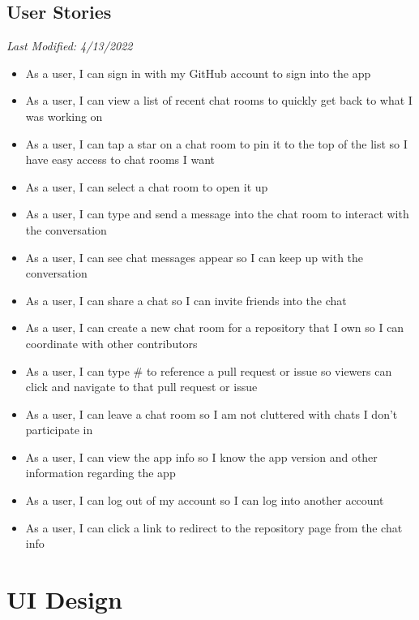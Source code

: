 \documentclass{report}
\begin{document}
\section{User Stories}
\textit{Last Modified: 4/13/2022}
\begin{itemize}
    \item As a user, I can sign in with my GitHub account to sign into the app
    \item As a user, I can view a list of recent chat rooms to quickly get back to what I was working on
    \item As a user, I can tap a star on a chat room to pin it to the top of the list so I have easy access to chat rooms I want
    \item As a user, I can select a chat room to open it up
    \item As a user, I can type and send a message into the chat room to interact with the conversation
    \item As a user, I can see chat messages appear so I can keep up with the conversation
    \item As a user, I can share a chat so I can invite friends into the chat
    \item As a user, I can create a new chat room for a repository that I own so I can coordinate with other contributors
    \item As a user, I can type \# to reference a pull request or issue so viewers can click and navigate to that pull request or issue
    \item As a user, I can leave a chat room so I am not cluttered with chats I don't participate in
    \item As a user, I can view the app info so I know the app version and other information regarding the app
    \item As a user, I can log out of my account so I can log into another account
    \item As a user, I can click a link to redirect to the repository page from the chat info
\end{itemize}

\chapter{UI Design}
\end{document}
